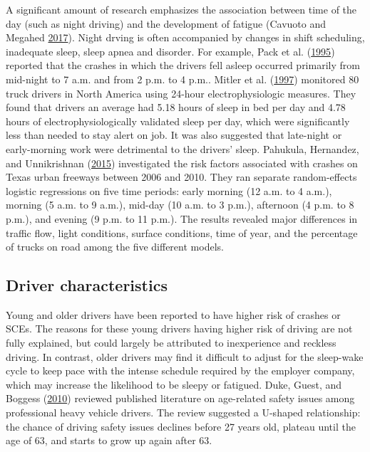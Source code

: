 \documentclass[12pt]{book}
\numberwithin{equation}{chapter}
\begin{document}
A significant amount of research emphasizes the association between time of the day (such as night driving) and the development of fatigue (Cavuoto and Megahed \protect\hyperlink{ref-cavuoto2017understanding}{2017}). Night drving is often accompanied by changes in shift scheduling, inadequate sleep, sleep apnea and disorder. For example, Pack et al. (\protect\hyperlink{ref-pack1995characteristics}{1995}) reported that the crashes in which the drivers fell asleep occurred primarily from mid-night to 7 a.m. and from 2 p.m. to 4 p.m.. Mitler et al. (\protect\hyperlink{ref-mitler1997sleep}{1997}) monitored 80 truck drivers in North America using 24-hour electrophysiologic measures. They found that drivers an average had 5.18 hours of sleep in bed per day and 4.78 hours of electrophysiologically validated sleep per day, which were significantly less than needed to stay alert on job. It was also suggested that late-night or early-morning work were detrimental to the drivers' sleep. Pahukula, Hernandez, and Unnikrishnan (\protect\hyperlink{ref-pahukula2015time}{2015}) investigated the risk factors associated with crashes on Texas urban freeways between 2006 and 2010. They ran separate random-effects logistic regressions on five time periods: early morning (12 a.m. to 4 a.m.), morning (5 a.m. to 9 a.m.), mid-day (10 a.m. to 3 p.m.), afternoon (4 p.m. to 8 p.m.), and evening (9 p.m. to 11 p.m.). The results revealed major differences in traffic flow, light conditions, surface conditions, time of year, and the percentage of trucks on road among the five different models.

\hypertarget{driver-characteristics}{%
\subsection{Driver characteristics}\label{driver-characteristics}}

Young and older drivers have been reported to have higher risk of crashes or SCEs. The reasons for these young drivers having higher risk of driving are not fully explained, but could largely be attributed to inexperience and reckless driving. In contrast, older drivers may find it difficult to adjust for the sleep-wake cycle to keep pace with the intense schedule required by the employer company, which may increase the likelihood to be sleepy or fatigued. Duke, Guest, and Boggess (\protect\hyperlink{ref-duke2010age}{2010}) reviewed published literature on age-related safety issues among professional heavy vehicle drivers. The review suggested a U-shaped relationship: the chance of driving safety issues declines before 27 years old, plateau until the age of 63, and starts to grow up again after 63.
\end{document}
